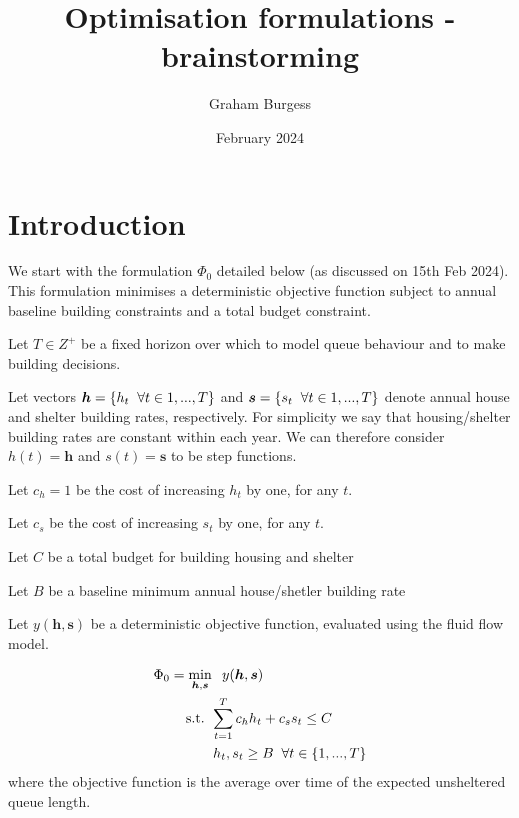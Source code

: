 \documentclass{article}
\title{Optimisation formulations - brainstorming}
\author{Graham Burgess}
\date{February 2024}
\begin{document}
%
\maketitle
\section{Introduction}
%
We start with the formulation $\Phi_0$ detailed below (as discussed on 15th Feb 2024). This formulation minimises a deterministic objective function subject to annual baseline building constraints and a total budget constraint. \par
%
Let $T \in Z^{+}$ be a fixed horizon over which to model queue behaviour and to make building decisions. \par
%
Let vectors $\boldsymbol{h} = \{h_t \hspace{0.2cm} \forall t \in {1,...,T}\}$ and $\boldsymbol{s} = \{s_t \hspace{0.2cm} \forall t \in {1,...,T}\}$ denote annual house and shelter building rates, respectively. For simplicity we say that housing/shelter building rates are constant within each year. We can therefore consider $h(t) = \boldsymbol{h}$ and $s(t) = \boldsymbol{s}$ to be step functions. \par
%
Let $c_{h} = 1$ be the cost of increasing $h_t$ by one, for any $t$. \par
%
Let $c_{s}$ be the cost of increasing $s_t$ by one, for any $t$. \par
%
Let $C$ be a total budget for building housing and shelter \par
%
Let $B$ be a baseline minimum annual house/shetler building rate \par
%
Let $y(\boldsymbol{h},\boldsymbol{s})$ be a deterministic objective function, evaluated using the fluid flow model. \par
%
\begin{align*}
        & \Phi_0 = \min_{\boldsymbol{h},\boldsymbol{s}} \hspace{0.2cm} y(\boldsymbol{h},\boldsymbol{s}) \\
        & \hspace{0.7cm} \text{ s.t. } \sum_{t=1}^{T} c_{h}h_{t} + c_{s}s_{t} \leq C \\
        & \hspace{1.5cm} h_t, s_t \geq B \hspace{0.2cm} \forall t \in \{1, ..., T\}
\end{align*}
%
where the objective function is the average over time of the expected unsheltered queue length. 
\end{document}
